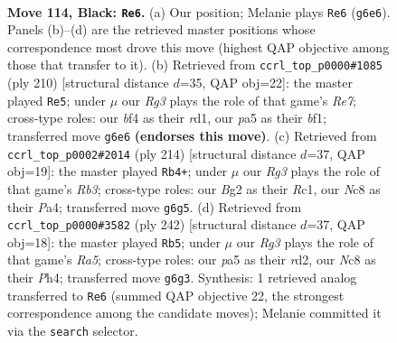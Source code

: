 \documentclass[11pt]{article}
\begin{document}
\clearpage

\begin{figure}[p]\centering
\begin{subfigure}{0.46\textwidth}\centering
\resizebox{\linewidth}{!}{%
\newchessgame
\chessboard[
  setfen={2n5/7K/p1k3r1/P4p1p/5B2/N5P1/6b1/R7 b - - 39 114},
  showmover=false,
  pgfstyle=straightmove, color=movearrow, markmove={g6-e6}
]}
\caption{}
\end{subfigure}\hfill
\begin{subfigure}{0.46\textwidth}\centering
\resizebox{\linewidth}{!}{%
\newchessgame
\chessboard[
  setfen={5k2/1BK1R3/p5p1/P5P1/8/8/8/3r1b2 w - - 66 106},
  showmover=false,
  pgfstyle=straightmove, color=movearrow, markmove={e7-e5}
]}
\caption{}
\end{subfigure}
\\[4pt]
\begin{subfigure}{0.46\textwidth}\centering
\resizebox{\linewidth}{!}{%
\newchessgame
\chessboard[
  setfen={8/6p1/4r3/3b2P1/P5k1/1R4p1/8/2R3K1 w - - 2 108},
  showmover=false,
  pgfstyle=straightmove, color=movearrow, markmove={b3-b4}
]}
\caption{}
\end{subfigure}\hfill
\begin{subfigure}{0.46\textwidth}\centering
\resizebox{\linewidth}{!}{%
\newchessgame
\chessboard[
  setfen={4k2B/8/2n3p1/R4p2/7P/5PP1/3r4/5K2 w - - 29 122},
  showmover=false,
  pgfstyle=straightmove, color=movearrow, markmove={a5-b5}
]}
\caption{}
\end{subfigure}
\caption{\textbf{Move 114, Black: \texttt{Re6}.} (a) Our position; Melanie plays \texttt{Re6} (\texttt{g6e6}). Panels (b)--(d) are the retrieved master positions whose correspondence most drove this move (highest QAP objective among those that transfer to it). (b) Retrieved from \texttt{ccrl\_top\_p0000\#1085} (ply 210) [structural distance $d$=35, QAP obj=22]: the master played \texttt{Re5}; under $\mu$ our \emph{Rg3} plays the role of that game's \emph{Re7}; cross-type roles: our \emph{b}f4 as their \emph{r}d1, our \emph{p}a5 as their \emph{b}f1; transferred move \texttt{g6e6} \textbf{(endorses this move)}. (c) Retrieved from \texttt{ccrl\_top\_p0002\#2014} (ply 214) [structural distance $d$=37, QAP obj=19]: the master played \texttt{Rb4+}; under $\mu$ our \emph{Rg3} plays the role of that game's \emph{Rb3}; cross-type roles: our \emph{B}g2 as their \emph{R}c1, our \emph{N}c8 as their \emph{P}a4; transferred move \texttt{g6g5}. (d) Retrieved from \texttt{ccrl\_top\_p0000\#3582} (ply 242) [structural distance $d$=37, QAP obj=18]: the master played \texttt{Rb5}; under $\mu$ our \emph{Rg3} plays the role of that game's \emph{Ra5}; cross-type roles: our \emph{p}a5 as their \emph{r}d2, our \emph{N}c8 as their \emph{P}h4; transferred move \texttt{g6g3}. Synthesis: 1 retrieved analog transferred to \texttt{Re6} (summed QAP objective 22, the strongest correspondence among the candidate moves); Melanie committed it via the \texttt{search} selector.}
\label{fig:thought-m227}
\end{figure}
\end{document}
